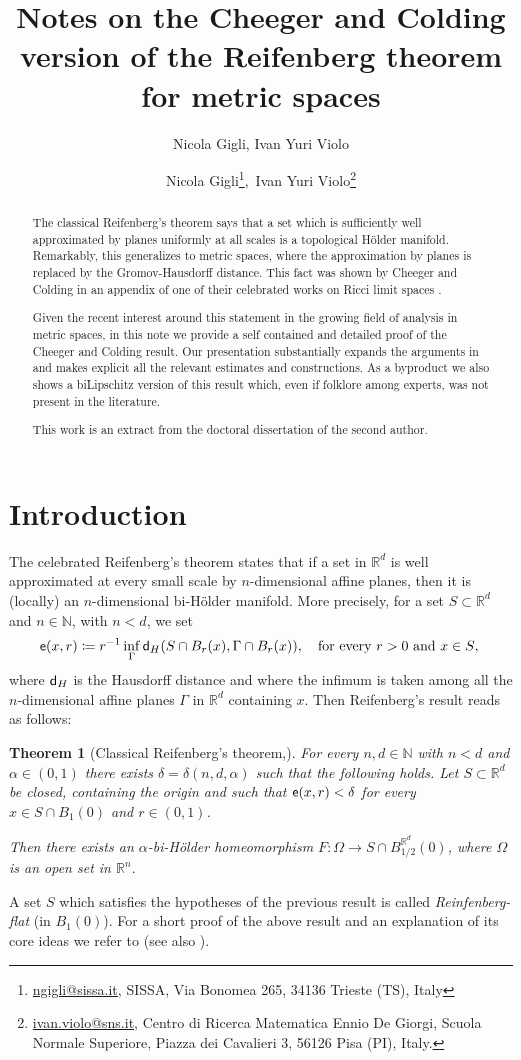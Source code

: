\documentclass[11pt]{article}
\author{Nicola Gigli, Ivan Yuri Violo}
\title{Notes on the Cheeger and Colding  version  of the Reifenberg theorem for metric spaces}
\author{Nicola Gigli\footnote{\href{mailto:ngigli@sissa.it}{ngigli@sissa.it}, SISSA, Via Bonomea 265, 34136 Trieste (TS), Italy},
\,Ivan Yuri Violo\footnote{\href{mailto:ivan.violo@sns.it}{ivan.violo@sns.it}, Centro di Ricerca Matematica Ennio De Giorgi, Scuola Normale Superiore, Piazza dei
Cavalieri 3, 56126 Pisa (PI), Italy.}}
\date{}
\newcommand{\rr}{\mathbb{R}}
\newcommand{\nn}{\mathbb{N}}
\newcommand{\sfd}{{\sf d}}
\newcommand{\ee}{{\sf e}}
\theoremstyle{plain}
\newtheorem{theorem}{Theorem}[section]
\theoremstyle{definition}
\numberwithin{equation}{section}
\begin{document}
\maketitle

\begin{abstract}
   The classical Reifenberg's theorem says that a set which is sufficiently well approximated by planes  uniformly at all scales is  a topological H\"older manifold. Remarkably,  this generalizes to metric spaces, where the approximation by planes is replaced by the Gromov-Hausdorff distance. This fact was shown by Cheeger and Colding in an appendix of one of their celebrated works on  Ricci limit spaces \cite{Cheegercolding}. 

   Given the recent interest around this statement in the growing field of  analysis in metric spaces, in this note we provide a self contained  and detailed proof of the Cheeger and Colding result. Our presentation substantially expands  the arguments in \cite{Cheegercolding} and makes explicit all the relevant estimates and constructions. As a byproduct we also shows a biLipschitz version of this result  which, even if folklore among experts, was not present in the literature. 
   
   

   This work is an extract from the doctoral dissertation of the second author.
\end{abstract}

\tableofcontents

\section{Introduction}
The celebrated Reifenberg's theorem \cite{r}  states that if a set in $\rr^d$ is well approximated at every small scale by $n$-dimensional affine planes, then it is (locally) an $n$-dimensional bi-H\"older manifold.  More precisely, for a set $S\subset  \rr^d$ and $n \in \mathbb{N}$, with $n < d$,  we set
\[
\ee(x,r)\coloneqq r^{-1}\inf_{\Gamma}  \sfd_H(S\cap B_{r}(x),\Gamma\cap B_{r}(x)), \quad \text{for every $r>0$ and $x \in S$},\\
\]
where  $ \sfd_H$ is the Hausdorff distance and where the infimum is  taken among all the  $n$-dimensional affine planes $\Gamma$ in $\rr^d$ containing $x$. Then Reifenberg's result reads as follows:
\begin{theorem}[Classical Reifenberg's theorem,\cite{r}]\label{thm:reif intro}
	For every $n,d\in \nn$  with $n<d$  and $\alpha\in(0,1)$ there exists $\delta=\delta(n,d,\alpha)$ such that the following holds. Let $S\subset \rr^d$ be closed, containing the origin and such that $\ee(x,r)<\delta$ for every $x \in S\cap B_1(0)$ and $r \in(0,1)$.
	
	Then there exists an $\alpha$-bi-H\"older homeomorphism $F: \Omega\to S\cap B_{1/2}^{\rr^d}(0)$, where $\Omega$ is an open set in $\rr^n.$
\end{theorem}
A set $S$ which satisfies the hypotheses of the previous result is called\textit{ Reinfenberg-flat} (in $B_1(0)$). For a short proof of the above result and an explanation of its core ideas we refer to \cite{simondisk} (see also  \cite{morrey}).
\end{document}
